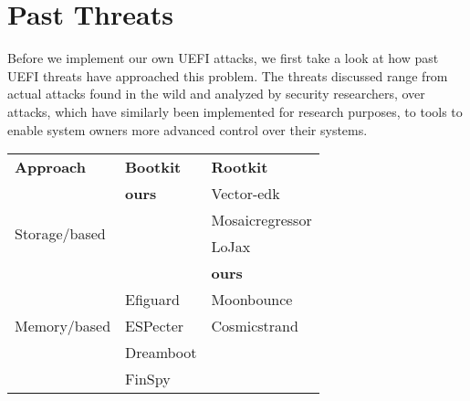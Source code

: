 
\chapter{Past Threats}
\label{sec:past-threats}


Before we implement our own \ac{UEFI} attacks, we first take a look at how past \ac{UEFI} threats have approached this problem.
The threats discussed range from actual attacks found in the wild and analyzed by security researchers, over attacks, which have similarly been implemented for research purposes, to tools to enable system owners more advanced control over their systems.

\begin{center}
    \begin{tabular}{lll}
        \toprule
        {\bfseries Approach}               & {\bfseries Bootkit} & {\bfseries Rootkit} \\
        \cmidrule[0.4pt](r){1-1}
        \cmidrule[0.4pt](l){2-3}
        \multirow{4}{4em}{Storage\-/based} & \textbf{ours}       & Vector-edk          \\
                                           &                     & Mosaicregressor     \\
                                           &                     & LoJax               \\
                                           &                     & \textbf{ours}       \\
        \cmidrule[0.4pt](r){1-1}
        \cmidrule[0.4pt](l){2-3}
        \multirow{3}{4em}{Memory\-/based}  & Efiguard            & Moonbounce          \\
                                           & ESPecter            & Cosmicstrand        \\
                                           & Dreamboot           &                     \\
                                           & FinSpy              &                     \\
        \bottomrule
    \end{tabular}
\end{center}


